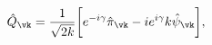 \begin{equation}
\hat{Q}_{\vk} = \frac{1}{\sqrt{2 k}} \biggl[e^{ -i \gamma } \hat{\pi}_{\vk} -
i e^{  i \gamma } k \hat{\psi}_{\vk} \biggr],
\label{Q}
\end{equation}

